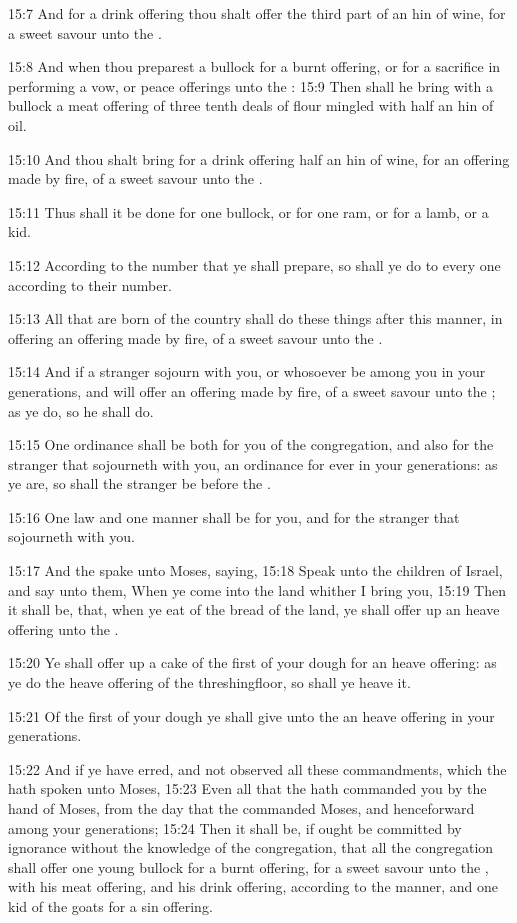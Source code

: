 15:7 And for a drink offering thou shalt offer the third part of an hin of wine, for a sweet savour unto the \LORD.

15:8 And when thou preparest a bullock for a burnt offering, or for a sacrifice in performing a vow, or peace offerings unto the \LORD: 15:9 Then shall he bring with a bullock a meat offering of three tenth deals of flour mingled with half an hin of oil.

15:10 And thou shalt bring for a drink offering half an hin of wine, for an offering made by fire, of a sweet savour unto the \LORD.

15:11 Thus shall it be done for one bullock, or for one ram, or for a lamb, or a kid.

15:12 According to the number that ye shall prepare, so shall ye do to every one according to their number.

15:13 All that are born of the country shall do these things after this manner, in offering an offering made by fire, of a sweet savour unto the \LORD.

15:14 And if a stranger sojourn with you, or whosoever be among you in your generations, and will offer an offering made by fire, of a sweet savour unto the \LORD; as ye do, so he shall do.

15:15 One ordinance shall be both for you of the congregation, and also for the stranger that sojourneth with you, an ordinance for ever in your generations: as ye are, so shall the stranger be before the \LORD.

15:16 One law and one manner shall be for you, and for the stranger that sojourneth with you.

15:17 And the \LORD spake unto Moses, saying, 15:18 Speak unto the children of Israel, and say unto them, When ye come into the land whither I bring you, 15:19 Then it shall be, that, when ye eat of the bread of the land, ye shall offer up an heave offering unto the \LORD.

15:20 Ye shall offer up a cake of the first of your dough for an heave offering: as ye do the heave offering of the threshingfloor, so shall ye heave it.

15:21 Of the first of your dough ye shall give unto the \LORD an heave offering in your generations.

15:22 And if ye have erred, and not observed all these commandments, which the \LORD hath spoken unto Moses, 15:23 Even all that the \LORD hath commanded you by the hand of Moses, from the day that the \LORD commanded Moses, and henceforward among your generations; 15:24 Then it shall be, if ought be committed by ignorance without the knowledge of the congregation, that all the congregation shall offer one young bullock for a burnt offering, for a sweet savour unto the \LORD, with his meat offering, and his drink offering, according to the manner, and one kid of the goats for a sin offering.

